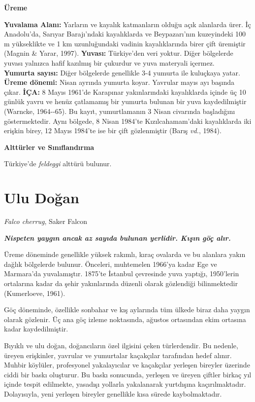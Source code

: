 \documentclass[
  10.5pt,
  a4paper,
  DIV=11,
  numbers=noendperiod,
  twocolumn]{scrreprt}
\begin{document}
\textbf{Üreme}

\textbf{Yuvalama Alanı:} Yarların ve kayalık katmanların olduğu açık
alanlarda ürer. İç Anadolu'da, Sarıyar Barajı'ndaki kayalıklarda ve
Beypazarı'nın kuzeyindeki 100 m yükseklikte ve 1 km uzunluğundaki
vadinin kayalıklarında birer çift üremiştir (Magnin \& Yarar, 1997).
\textbf{Yuvası:} Türkiye'den veri yoktur. Diğer bölgelerde yuvası
yalnızca hafif kazılmış bir çukurdur ve yuva materyali içermez.\\
\textbf{Yumurta sayısı:} Diğer bölgelerde genellikle 3-4 yumurta ile
kuluçkaya yatar.\\
\textbf{Üreme dönemi:} Nisan ayrında yumurta koyar. Yavrular mayıs ayı
başında çıkar. \textbf{İÇA:} 8 Mayıs 1961'de Karapınar yakınlarındaki
kayalıklarda içinde üç 10 günlük yavru ve henüz çatlamamış bir yumurta
bulunan bir yuva kaydedilmiştir (Warncke, 1964-\/-65). Bu kayıt,
yumurtlamanın 3 Nisan civarında başladığını göstermektedir. Aynı
bölgede, 8 Nisan 1984'te Kızılcahamam'daki kayalıklarda iki erişkin
birey, 12 Mayıs 1984'te ise bir çift gözlenmiştir (Barış \emph{vd.},
1984).

\textbf{Alttürler ve Sınıflandırma}

Türkiye'de \emph{feldeggi} alttürü bulunur.

\section{Ulu Doğan}\label{ulu-doux11fan}

\emph{Falco cherrug}, Saker Falcon

\textbf{\emph{Nispeten yaygın ancak az sayıda bulunan yerlidir. Kışın
göç alır.}}

Üreme döneminde genellikle yüksek rakımlı, kıraç ovalarda ve bu alanlara
yakın dağlık bölgelerde bulunur. Önceleri, muhtemelen 1966'ya kadar Ege
ve Marmara'da yuvalamıştır. 1875'te İstanbul çevresinde yuva yaptığı,
1950'lerin ortalarına kadar da şehir yakınlarında düzenli olarak
gözlendiği bilinmektedir (Kumerloeve, 1961).

Göç döneminde, özellikle sonbahar ve kış aylarında tüm ülkede biraz daha
yaygın olarak gözlenir. Üç ana göç izleme noktasında, ağustos ortasından
ekim ortasına kadar kaydedilmiştir.

Bıyıklı ve ulu doğan, doğancıların özel ilgisini çeken türlerdendir. Bu
nedenle, üreyen erişkinler, yavrular ve yumurtalar kaçakçılar tarafından
hedef alınır. Muhbir köylüler, profesyonel yakalayıcılar ve kaçakçılar
yerleşen bireyler üzerinde ciddi bir baskı oluşturur. Bu baskı
sonucunda, yerleşen ve üreyen çiftler birkaç yıl içinde tespit
edilmekte, yasadışı yollarla yakalanarak yurtdışına kaçırılmaktadır.
Dolayısıyla, yeni yerleşen bireyler genellikle kısa sürede
kaybolmaktadır.
\end{document}
